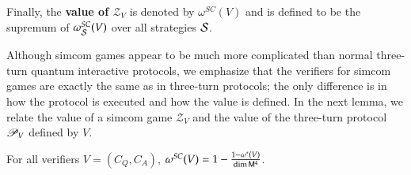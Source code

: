 Finally, the \textbf{value of $\mathscr{Z}_V$} is denoted by $\omega^{SC}(V)$ and is defined to be the supremum of $\omega^{SC}_{\mathcal{S}}(V)$ over all strategies $\mathcal{S}$.


Although simcom games appear to be much more complicated than normal three-turn quantum interactive protocols, we emphasize that the verifiers for simcom games are exactly the same as in three-turn protocols; the only difference is in how the protocol is executed and how the value is defined. In the next lemma, we relate the value of a simcom game $\mathscr{Z}_V$ and the value of the three-turn protocol $\mathscr{P}_V$ defined by $V$.

\begin{lemma}
\label{lem:convert_to_simcom}
	For all verifiers $V = (C_Q,C_A)$, $\omega^{SC}(V) = 1 - \frac{1 - \omega^*(V)}{\dim {\mathsf{M}}^4}$. 
\end{lemma}
